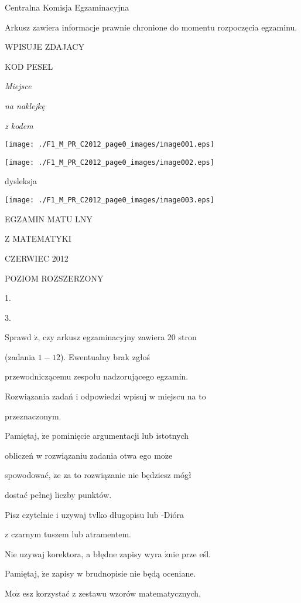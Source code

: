\documentclass[a4paper,12pt]{article}
\begin{document}
Centralna Komisja Egzaminacyjna

Arkusz zawiera informacje prawnie chronione do momentu rozpoczęcia egzaminu.

WPISUJE ZDAJACY

KOD PESEL

{\it Miejsce}

{\it na naklejkę}

{\it z kodem}
\begin{center}
\texttt{[image: ./F1\_M\_PR\_C2012\_page0\_images/image001.eps]}

\texttt{[image: ./F1\_M\_PR\_C2012\_page0\_images/image002.eps]}
\end{center}
\fbox{} dysleksja
\begin{center}
\texttt{[image: ./F1\_M\_PR\_C2012\_page0\_images/image003.eps]}
\end{center}
EGZAMIN MATU LNY

Z MATEMATYKI

CZERWIEC 2012

POZIOM ROZSZERZONY

1.

3.

Sprawd $\acute{\mathrm{z}}$, czy arkusz egzaminacyjny zawiera 20 stron

(zadania $1-12$). Ewentualny brak zgłoś

przewodniczącemu zespołu nadzorującego egzamin.

Rozwiązania zadań i odpowiedzi wpisuj w miejscu na to

przeznaczonym.

Pamiętaj, $\dot{\mathrm{z}}\mathrm{e}$ pominięcie argumentacji lub istotnych

obliczeń w rozwiązaniu zadania otwa ego $\mathrm{m}\mathrm{o}\dot{\mathrm{z}}\mathrm{e}$

spowodować, $\dot{\mathrm{z}}\mathrm{e}$ za to rozwiązanie nie będziesz mógł

dostać pełnej liczby punktów.

Pisz czytelnie i uzywaj tvlko długopisu lub -Dióra

z czarnym tuszem lub atramentem.

Nie uzywaj korektora, a błędne zapisy wyra $\acute{\mathrm{z}}\mathrm{n}\mathrm{i}\mathrm{e}$ prze eśl.

Pamiętaj, $\dot{\mathrm{z}}\mathrm{e}$ zapisy w brudnopisie nie będą oceniane.

$\mathrm{M}\mathrm{o}\dot{\mathrm{z}}$ esz korzystać z zestawu wzorów matematycznych,
\end{document}
